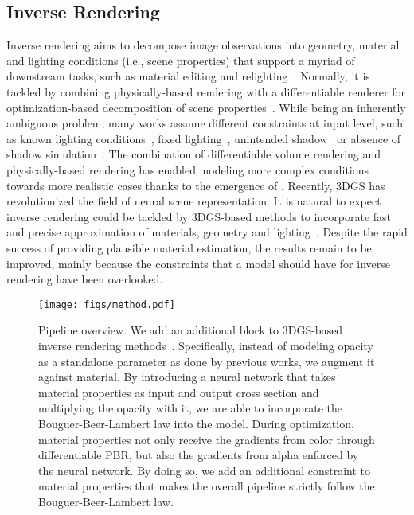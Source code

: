 \subsection{Inverse Rendering}
Inverse rendering aims to decompose image observations into geometry, material and lighting conditions (i.e., scene properties) that support a myriad of downstream tasks, such as material editing and relighting~\citep{li2023multi, zhang2022modeling, kanamori2019relighting, yang2022ps}. Normally, it is tackled by combining physically-based rendering with a differentiable renderer for optimization-based decomposition of scene properties~\citep{kajiya1986rendering, chen2019learning}. While being an inherently ambiguous problem, many works assume different constraints at input level, such as known lighting conditions~\citep{bi2020neural, srinivasan2021nerv, zhang2022modeling}, fixed lighting~\citep{dong2014appearance}, unintended shadow~\citep{verbin2024eclipse} or absence of shadow simulation~\citep{zhang2021physg}. The combination of differentiable volume rendering and physically-based rendering has enabled modeling more complex conditions towards more realistic cases thanks to the emergence of . Recently, 3DGS has revolutionized the field of neural scene representation. It is natural to expect inverse rendering could be tackled by 3DGS-based methods to incorporate fast and precise approximation of materials, geometry and lighting~\citep{liang2024gs, jiang2024gaussianshader, gao2023relightable}. Despite the rapid success of providing plausible material estimation, the results remain to be improved, mainly because the constraints that a model should have for inverse rendering have been overlooked.

\begin{figure}[t]
\begin{center}
\texttt{[image: figs/method.pdf]}
\end{center}
\caption{ Pipeline overview. We add an additional block to 3DGS-based inverse rendering methods~\citep{liang2024gs, kerbl20233d, jiang2024gaussianshader, gao2023relightable}. Specifically, instead of modeling opacity as a standalone parameter as done by previous works, we augment it against material. By introducing a neural network that takes material properties as input and output cross section and multiplying the opacity with it, we are able to incorporate the Bouguer-Beer-Lambert law into the model. During optimization, material properties not only receive the gradients from color through differentiable PBR, but also the gradients from alpha enforced by the neural network. By doing so, we add an additional constraint to material properties that makes the overall pipeline strictly follow the Bouguer-Beer-Lambert law.}
\label{fig:method}
\end{figure}
